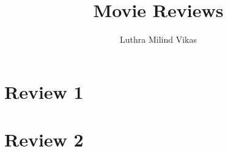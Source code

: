 \documentclass{article}
\author{Luthra Milind Vikas}
\date{}
\title{Movie Reviews}
\begin{document}
\maketitle

\section{Review 1}

\section{Review 2}
\end{document}

